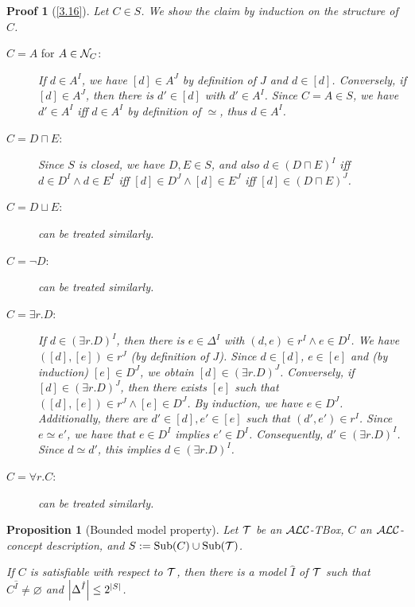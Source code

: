 \documentclass[openany]{scrbook}
\theoremstyle{break}
\newtheorem{Proposition}[Theorem]{Proposition}
\theoremstyle{nonumberbreak}
\theoremstyle{nonumberplain}
\theoremstyle{nonumberbreak}
\newtheorem{Proof}{Proof}
\newcommand{\then}{\Longrightarrow}
\newcommand{\abs}[2][]{\left|{#2}\right|\ifx#1\then\else_{#1}\fi}
\newcommand{\Sub}{\operatorname{Sub}}
\newcommand{\ALC}{{\cal A}{\cal L}{\cal C}}
\begin{document}
\begin{Proof}[\cref{3.16}]
  Let $C \in S$. We show the claim by induction on the structure of
  $C$.
  \begin{description}
  \item[$C = A$ for $A \in {\cal N}_C$:] If $d \in A^I$, we have $[d]
    \in A^J$ by definition of $J$ and $d \in [d]$. Conversely, if $[d]
    \in A^J$, then there is $d' \in [d]$ with $d' \in A^I$. Since $C =
    A \in S$, we have $d' \in A^I$ iff $d \in A^I$ by definition of
    $\simeq$, thus $d \in A^I$.
  \item[$C = D \sqcap E$:] Since $S$ is closed, we have $D, E \in S$,
    and also $d \in (D \sqcap E)^I$ iff $d \in D^I \wedge d \in E^I$
    iff $[d] \in D^J \wedge [d] \in E^J$ iff $[d] \in (D \sqcap E)^J$.
  \item[$C = D \sqcup E$:] can be treated similarly.
  \item[$C = \neg D$:] can be treated similarly.
  \item[$C = \exists r.D$:] If $d \in (\exists r.D)^I$, then there is
    $e \in \Delta^I$ with $(d, e) \in r^I \wedge e \in D^I$. We have
    $([d], [e]) \in r^J$ (by definition of $J$). Since $d \in [d]$, $e
    \in [e]$ and (by induction) $[e] \in D^J$, we obtain $[d] \in
    (\exists r. D)^J$. Conversely, if $[d] \in (\exists r.D)^J$, then
    there exists $[e]$ such that $([d], [e]) \in r^J \wedge [e] \in
    D^J$. By induction, we have $e \in D^J$. Additionally, there are
    $d' \in [d], e' \in [e]$ such that $(d', e') \in r^I$. Since $e
    \simeq e'$, we have that $e \in D^I$ implies $e' \in
    D^I$. Consequently, $d' \in (\exists r.D)^I$. Since $d \simeq d'$,
    this implies $d \in (\exists r.D)^I$.
  \item[$C = \forall r.C$:] can be treated similarly.
  \end{description}
\end{Proof}

\begin{Proposition}[Bounded model property]
  \label{3.17}
  Let ${\cal T}$ be an $\ALC$-TBox, $C$ an $\ALC$-concept
  description, and $S := \Sub(C) \cup \Sub({\cal T})$.

  If $C$ is satisfiable with respect to ${\cal T}$, then there is a
  model $\hat{I}$ of ${\cal T}$ such that $C^{\hat{I}} \ne
  \varnothing$ and $\abs{\Delta^{\hat{I}}} \leq 2^{\abs{S}}$.
\end{Proposition}
\end{document}
